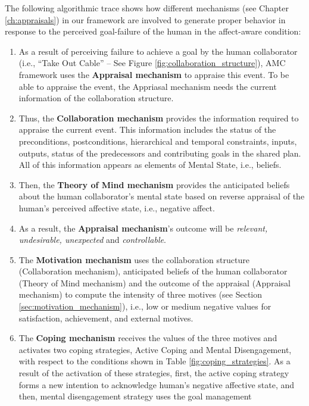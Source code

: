 \documentclass[12pt]{report}
\begin{document}
The following algorithmic trace shows how different mechanisms (see Chapter
\ref{ch:appraisals}) in our framework are involved to generate proper behavior
in response to the perceived goal-failure of the human in the affect-aware
condition:

\begin{enumerate}
  \setlength\itemsep{-3mm}
  \item As a result of perceiving failure to achieve a goal by the human
  collaborator (i.e., ``Take Out Cable'' -- See Figure
  \ref{fig:collaboration_structure}), AMC framework uses the \textbf{Appraisal
  mechanism} to appraise this event. To be able to appraise the event, the
  Appriasal mechanism needs the current information of the collaboration
  structure.
  \item Thus, the \textbf{Collaboration mechanism} provides the information
  required to appraise the current event. This information includes the status
  of the preconditions, postconditions, hierarchical and temporal constraints,
  inputs, outputs, status of the predecessors and contributing goals in the
  shared plan. All of this information appears as elements of Mental
  State, i.e., beliefs.
  \item Then, the \textbf{Theory of Mind mechanism} provides the anticipated
  beliefs about the human collaborator's mental state based on reverse appraisal
  of the human's perceived affective state, i.e., negative affect.
  \item As a result, the \textbf{Appraisal mechanism}'s outcome will be
  \textit{relevant, undesirable, unexpected} and \textit{controllable}.
  \item The \textbf{Motivation mechanism} uses the collaboration structure
  (Collaboration mechanism), anticipated beliefs of the human collaborator
  (Theory of Mind mechanism) and the outcome of the appraisal (Appraisal
  mechanism) to compute the intensity of three motives (see Section
  \ref{sec:motivation_mechanism}), i.e., low or medium negative values for
  satisfaction, achievement, and external motives.
  \item The \textbf{Coping mechanism} receives the values of the three motives
  and activates two coping strategies, Active Coping and Mental Disengagement,
  with respect to the conditions shown in Table \ref{fig:coping_strategies}. As
  a result of the activation of these strategies, first, the active coping
  strategy forms a new intention to acknowledge human's negative affective
  state, and then, mental disengagement strategy uses the goal management

\end{enumerate}
\end{document}
